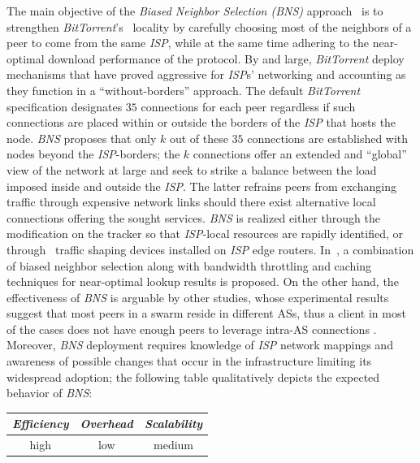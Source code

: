 The main objective of the \emph{Biased Neighbor Selection (BNS)} 
approach~\cite{BCCMSBZ2006} is to 
strengthen {\sl BitTorrent}'s~\cite{c_bittorrent_2003} locality 
by carefully choosing most of the neighbors of a peer to come from 
the same \emph{ISP}, while at the same time adhering to the near-optimal
download performance of the protocol.
By and large, {\sl BitTorrent} deploy mechanisms that have proved
aggressive for \emph{ISP}s' networking and accounting as they function 
in a ``without-borders'' approach. The default {\sl BitTorrent} specification
designates $35$ connections for each peer regardless if such connections are
placed within or outside the borders of the \emph{ISP} that hosts the node.
\emph{BNS} proposes that only $k$ out of these $35$ connections are 
established with nodes beyond the {\it ISP}-borders;
the $k$ connections offer an extended and ``global'' view of 
the network at large and seek to strike a balance between 
the load imposed inside and outside the \emph{ISP}.
The latter refrains peers from exchanging traffic through
expensive network links should there exist alternative local connections
offering the sought services. 
\emph{BNS} is realized either through 
the modification on the tracker so that \emph{ISP}-local resources are rapidly 
identified,
or through \p\ traffic shaping devices installed on \emph{ISP} edge routers. 
In~\cite{BCCMSBZ2006}, a combination of 
biased neighbor selection along with bandwidth throttling
and caching techniques for near-optimal lookup results is proposed. On the other
hand, the effectiveness of \emph{BNS} is arguable by other studies, whose
experimental results suggest that most peers in a swarm reside in different ASs,
thus a client in most of the cases does not have enough peers to leverage
intra-AS connections \cite{RTLCGZ2010}. Moreover, \emph{BNS} deployment
requires knowledge of \emph{ISP} network mappings and awareness of possible
changes that occur in the infrastructure limiting its widespread adoption; the
following table qualitatively depicts the expected behavior of \emph{BNS}:
\begin{center}
{\footnotesize
\begin{tabular}{ccc}
\emph{Efficiency} & \emph{Overhead} & \emph{Scalability} \\
\hline
high &
low &
medium
\end{tabular}
}
\end{center}

